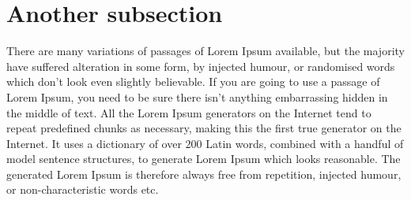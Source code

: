 \section{Another subsection} 
There are many variations of passages of Lorem Ipsum available, but the majority have suffered alteration in some form, by injected humour, or randomised words which don't look even slightly believable. If you are going to use a passage of Lorem Ipsum, you need to be sure there isn't anything embarrassing hidden in the middle of text. All the Lorem Ipsum generators on the Internet tend to repeat predefined chunks as necessary, making this the first true generator on the Internet. It uses a dictionary of over 200 Latin words, combined with a handful of model sentence structures, to generate Lorem Ipsum which looks reasonable. The generated Lorem Ipsum is therefore always free from repetition, injected humour, or non-characteristic words etc.
